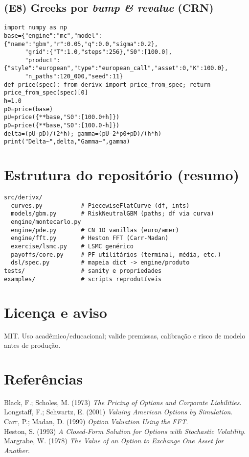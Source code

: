 \documentclass[11pt,a4paper]{article}
\begin{document}
\subsection{(E8) Greeks por \emph{bump \& revalue} (CRN)}
\begin{lstlisting}[style=pystyle]
import numpy as np
base={"engine":"mc","model":{"name":"gbm","r":0.05,"q":0.0,"sigma":0.2},
      "grid":{"T":1.0,"steps":256},"S0":[100.0],
      "product":{"style":"european","type":"european_call","asset":0,"K":100.0},
      "n_paths":120_000,"seed":11}
def price(spec): from derivx import price_from_spec; return price_from_spec(spec)[0]
h=1.0
p0=price(base)
pU=price({**base,"S0":[100.0+h]})
pD=price({**base,"S0":[100.0-h]})
delta=(pU-pD)/(2*h); gamma=(pU-2*p0+pD)/(h*h)
print("Delta~",delta,"Gamma~",gamma)
\end{lstlisting}

\section{Estrutura do repositório (resumo)}
\begin{verbatim}
src/derivx/
  curves.py           # PiecewiseFlatCurve (df, ints)
  models/gbm.py       # RiskNeutralGBM (paths; df via curva)
  engine/montecarlo.py
  engine/pde.py       # CN 1D vanillas (euro/amer)
  engine/fft.py       # Heston FFT (Carr-Madan)
  exercise/lsmc.py    # LSMC genérico
  payoffs/core.py     # PF utilitários (terminal, média, etc.)
  dsl/spec.py         # mapeia dict -> engine/produto
tests/                # sanity e propriedades
examples/             # scripts reprodutíveis
\end{verbatim}

\section{Licença e aviso}
MIT. Uso acadêmico/educacional; valide premissas, calibração e risco de modelo antes de produção.

\section*{Referências}
\noindent
Black, F.; Scholes, M. (1973) \emph{The Pricing of Options and Corporate Liabilities}.\\
Longstaff, F.; Schwartz, E. (2001) \emph{Valuing American Options by Simulation}.\\
Carr, P.; Madan, D. (1999) \emph{Option Valuation Using the FFT}.\\
Heston, S. (1993) \emph{A Closed-Form Solution for Options with Stochastic Volatility}.\\
Margrabe, W. (1978) \emph{The Value of an Option to Exchange One Asset for Another}.
\end{document}
